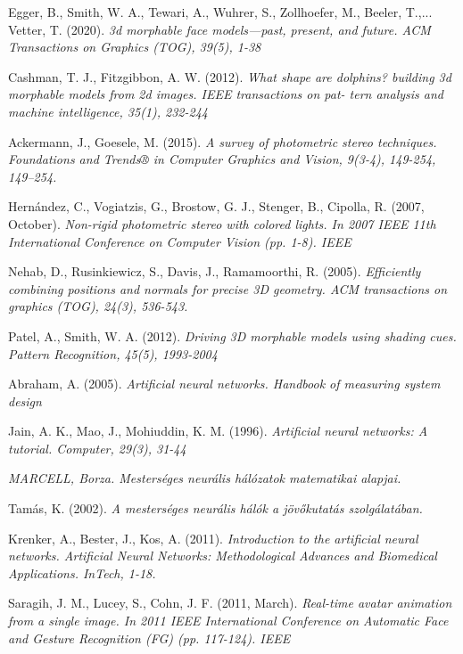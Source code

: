 \documentclass[12pt,a4]{article}
\begin{document}
\begin{thebibliography}{9}
		Egger, B., Smith, W. A., Tewari, A., Wuhrer, S., Zollhoefer, M., Beeler,
		T.,... Vetter, T. (2020).
		\textit{3d morphable face models—past, present, and
		future. ACM Transactions on Graphics (TOG), 39(5), 1-38}
		
		Cashman, T. J., Fitzgibbon, A. W. (2012).
		\textit{What shape are dolphins?
		building 3d morphable models from 2d images. IEEE transactions on pat-
		tern analysis and machine intelligence, 35(1), 232-244}
		
		Ackermann, J., Goesele, M. (2015).
		\textit{A survey of photometric stereo
			techniques. Foundations and Trends® in Computer Graphics and Vision,
			9(3-4), 149-254, 149–254.}
		
		Hernández, C., Vogiatzis, G., Brostow, G. J., Stenger, B., Cipolla,
		R. (2007, October).
		\textit{Non-rigid photometric stereo with colored lights. In
			2007 IEEE 11th International Conference on Computer Vision (pp. 1-8).
			IEEE}
		
		Nehab, D., Rusinkiewicz, S., Davis, J., Ramamoorthi, R. (2005).
		\textit{Efficiently combining positions and normals for precise 3D geometry. ACM transactions on graphics (TOG), 24(3), 536-543.}
			
		Patel, A., Smith, W. A. (2012).
		\textit{Driving 3D morphable models using shading cues. Pattern Recognition, 45(5), 1993-2004}
		
		Abraham, A. (2005).
		\textit{Artificial neural networks. Handbook of measuring system design}
		
		Jain, A. K., Mao, J., Mohiuddin, K. M. (1996).
		\textit{Artificial neural networks: A tutorial. Computer, 29(3), 31-44}
		
		\textit{MARCELL, Borza. Mesterséges neurális hálózatok matematikai alapjai.}
		
		Tamás, K. (2002).
		\textit{A mesterséges neurális hálók a jövőkutatás
			szolgálatában.}
		
		Krenker, A., Bester, J., Kos, A. (2011).
		\textit{Introduction to the artificial neural networks. Artificial Neural Networks: Methodological Advances and
			Biomedical Applications. InTech, 1-18.}
		
		Saragih, J. M., Lucey, S., Cohn, J. F. (2011, March). 
		\textit{Real-time avatar
			animation from a single image. In 2011 IEEE International Conference
			on Automatic Face and Gesture Recognition (FG) (pp. 117-124). IEEE}
		

\end{thebibliography}
\end{document}
